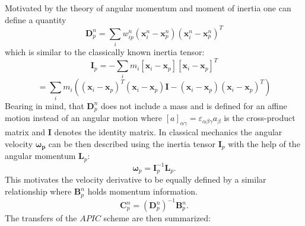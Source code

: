 \documentclass[m,times]{cgMA}
\begin{document}
Motivated by the theory of angular momentum and moment of inertia one can define a quantity
\begin{equation}
\boldsymbol { D } _ { p } ^ { n } = \sum _ { i } w _ { i p } ^ { n } ( \boldsymbol { x } _ { i } ^ { n } - \boldsymbol { x } _ { p } ^ { n } ) ( \boldsymbol { x } _ { i } ^ { n } - \boldsymbol { x } _ { p } ^ { n } ) ^ { T }
\end{equation}
which is similar to the classically known inertia tensor:
\begin{equation}
  \boldsymbol{I} _ { p } = - \sum _ { i } m _ { i } [\boldsymbol{x} _ { i }-\boldsymbol{x}_{p}][\boldsymbol{x} _ { i }-\boldsymbol{x}_{p}]^T
\end{equation}
$$
=
\sum _ { i } m _ { i }((\boldsymbol{x} _ { i }-\boldsymbol{x}_{p})^T(\boldsymbol{x} _ { i }-\boldsymbol{x}_{p})\boldsymbol{I} -(\boldsymbol{x} _ { i }-\boldsymbol{x}_{p})(\boldsymbol{x} _ { i }-\boldsymbol{x}_{p})^T)
$$
Bearing in mind, that $\boldsymbol{D}_p^n$ does not include a mass and is defined for an affine motion instead of an angular motion where $[a]_{\alpha\gamma} = \varepsilon_{\alpha\beta\gamma}a_{\beta}$ is the cross-product matrix and $\boldsymbol{I}$ denotes the identity matrix.
In classical mechanics the angular velocity $\boldsymbol{\omega_p}$ can be then described using the inertia tensor $\boldsymbol{I}_p$ with the help of the angular momentum $\boldsymbol{L}_p$:
\begin{equation}
  \boldsymbol{\omega}_p = \boldsymbol{I}_p^{-1} \boldsymbol{L}_p.
\end{equation}
This motivates the velocity derivative to be equally defined by a similar relationship where $\boldsymbol{B}^n_p$ holds momentum information.
\begin{equation}
  \boldsymbol{C}^n_p = (\boldsymbol{D}_p^n)^{-1} \boldsymbol{B}^n_p.
\end{equation}
The transfers of the $APIC$ scheme are then summarized:
\end{document}
